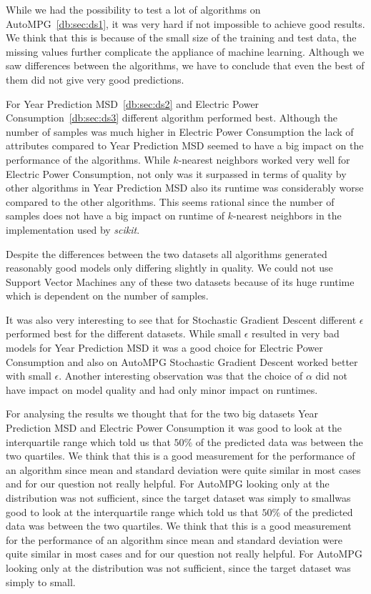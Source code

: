 While we had the possibility to test a lot of algorithms on AutoMPG~\ref{db:sec:ds1}, it was very hard if not impossible to achieve good results. We think that this is because of the small size of the training and test data, the missing values further complicate the appliance of machine learning. Although we saw differences between the algorithms, we have to conclude that even the best of them did not give very good predictions.\par
For Year Prediction MSD~\ref{db:sec:ds2} and Electric Power Consumption~\ref{db:sec:ds3} different algorithm performed best. Although the number of samples was much higher in Electric Power Consumption the lack of attributes compared to Year Prediction MSD seemed to have a big impact on the performance of the algorithms. While $k$-nearest neighbors worked very well for Electric Power Consumption, not only was it surpassed in terms of quality by other algorithms in Year Prediction MSD also its runtime was considerably worse compared to the other algorithms. This seems rational since the number of samples does not have a big impact on runtime of $k$-nearest neighbors in the implementation used by \textit{scikit}.\par
Despite the differences between the two datasets all algorithms generated reasonably good models only differing slightly in quality. We could not use Support Vector Machines any of these two datasets because of its huge runtime which is dependent on the number of samples.\par

It was also very interesting to see that for Stochastic Gradient Descent different $\epsilon$ performed best for the different datasets. While small $\epsilon$ resulted in very bad models for Year Prediction MSD it was a good choice for Electric Power Consumption and also on AutoMPG Stochastic Gradient Descent worked better with small $\epsilon$. Another interesting observation was that the choice of $\alpha$ did not have impact on model quality and had only minor impact on runtimes.\par

For analysing the results we thought that for the two big datasets Year Prediction MSD and Electric Power Consumption it was good to look at the interquartile range which told us that $50\%$ of the predicted data was between the two quartiles. We think that this is a good measurement for the performance of an algorithm since mean and standard deviation were quite similar in most cases and for our question not really helpful. For AutoMPG looking only at the distribution was not sufficient, since the target dataset was simply to smallwas good to look at the interquartile range which told us that $50\%$ of the predicted data was between the two quartiles. We think that this is a good measurement for the performance of an algorithm since mean and standard deviation were quite similar in most cases and for our question not really helpful. For AutoMPG looking only at the distribution was not sufficient, since the target dataset was simply to small.
